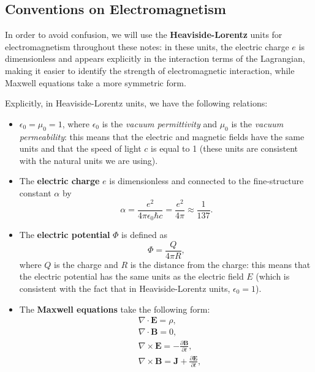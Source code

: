 \subsection*{Conventions on Electromagnetism}

In order to avoid confusion, we will use the \textbf{Heaviside-Lorentz} units for electromagnetism throughout these notes: in these units, the electric charge \(e\) is dimensionless and appears explicitly in the interaction terms of the Lagrangian, making it easier to identify the strength of electromagnetic interaction, while Maxwell equations take a more symmetric form.

Explicitly, in Heaviside-Lorentz units, we have the following relations:
\begin{itemize}
    \item \(\epsilon_0 = \mu_0 = 1\), where \(\epsilon_0\) is the \textit{vacuum permittivity} and \(\mu_0\) is the \textit{vacuum permeability}: this means that the electric and magnetic fields have the same units and that the speed of light \(c\) is equal to 1 (these units are consistent with the natural units we are using).
    \item The \textbf{electric charge} \(e\) is dimensionless and connected to the fine-structure constant \(\alpha\) by
          \[
              \alpha = \frac{e^2}{4\pi \epsilon_0 \hbar c} =  \frac{e^2}{4\pi} \approx \frac{1}{137}.
          \]
    \item The \textbf{electric potential} \(\Phi\) is defined as
          \[
              \Phi = \frac{Q}{4 \pi R},
          \]
          where \(Q\) is the charge and \(R\) is the distance from the charge: this means that the electric potential has the same units as the electric field \(E\) (which is consistent with the fact that in Heaviside-Lorentz units, \(\epsilon_0 = 1\)).
    \item The \textbf{Maxwell equations} take the following form:
          \[
              \begin{aligned}
                   & \nabla \cdot \mathbf{E} = \rho,                                                 \\
                   & \nabla \cdot \mathbf{B} = 0,                                                    \\
                   & \nabla \times \mathbf{E} = -\frac{\partial \mathbf{B}}{\partial t},             \\
                   & \nabla \times \mathbf{B} = \mathbf{J} + \frac{\partial \mathbf{E}}{\partial t},
              \end{aligned}
\]
\end{itemize}
